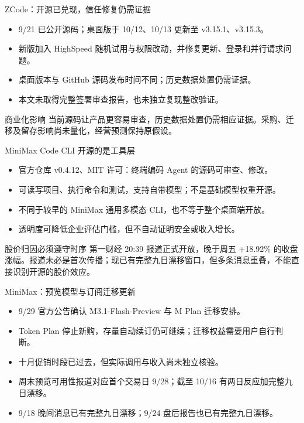 \documentclass[aspectratio=169,11pt]{beamer}
\newcommand{\smallnote}[1]{\vspace{0.2em}{\footnotesize #1}}
\begin{document}
\begin{frame}{ZCode：开源已兑现，信任修复仍需证据}
  \begin{itemize}
    \item 9/21 已公开源码；桌面版于 10/12、10/13 更新至 v3.15.1、v3.15.3。
    \item 新版加入 HighSpeed 随机试用与权限改动，并修复更新、登录和并行请求问题。
    \item 桌面版本与 GitHub 源码发布时间不同；历史数据处置仍需证据。
    \item 本文未取得完整签署审查报告，也未独立复现整改验证。
  \end{itemize}
  \begin{block}{商业化影响}
    当前源码让产品更容易审查，历史数据处置仍需相应证据。采购、迁移及留存影响尚未量化，经营预测保持原假设。
  \end{block}
  \smallnote{来源：zcode.z.ai/en/changelog（10/12--13）；GitHub 源码发布记录。}
\end{frame}

\begin{frame}{MiniMax Code CLI 开源的是工具层}
  \begin{itemize}
    \item 官方仓库 v0.4.12、MIT 许可：终端编码 Agent 的源码可审查、修改。
    \item 可读写项目、执行命令和测试，支持自带模型；不是基础模型权重开源。
    \item 不同于较早的 MiniMax 通用多模态 CLI，也不等于整个桌面端开放。
    \item 透明度可降低企业评估门槛，但不自动证明安全或收入增长。
  \end{itemize}
  \begin{block}{股价归因必须遵守时序}
    第一财经 20:39 报道正式开放，晚于周五 +18.92\% 的收盘涨幅。报道未必是首次传播；现已有完整九日漂移窗口，但多条消息重叠，不能直接识别开源的股价效应。
  \end{block}
  \smallnote{来源：MiniMax 官方 9/18 GitHub 快照与第一财经。同样不将智谱 +5.41\% 归因于晚间回应。}
\end{frame}

\begin{frame}{MiniMax：预览模型与订阅迁移更新}
  \begin{itemize}
    \item 9/29 官方公告确认 M3.1-Flash-Preview 与 M Plan 迁移安排。
    \item Token Plan 停止新购，存量自动续订仍可继续；迁移权益需要用户自行判断。
    \item 十月促销时段已过去，但实际调用与收入尚未独立核验。
    \item 周末预览可用性报道对应首个交易日 9/28；截至 10/16 有两日反应加完整九日漂移。
    \item 9/18 晚间消息已有完整九日漂移；9/24 盘后报告也已有完整九日漂移。
  \end{itemize}
  \smallnote{来源：MiniMax 9/29 官方订阅公告；模型最早可用时点仍缺独立核验。上述九月窗口均已满九日漂移。}
\end{frame}
\end{document}
